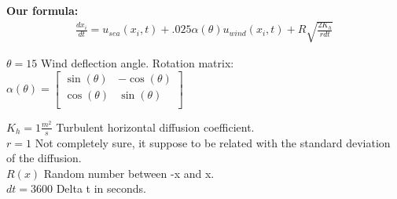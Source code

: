 \documentclass[a4paper,12pt]{article}
\begin{document}
\textbf{Our formula:}
\begin{equation}
\begin{split}
\frac{dx_i}{dt} = u_{sea}(x_i, t) + .025 \alpha(\theta) u_{wind}(x_i,t) + R \sqrt{\frac{2K_h}{r dt}} 
\end{split}
\end{equation}

$\theta = 15$ Wind deflection angle. Rotation matrix:  
$
\alpha(\theta)
 = 
    \begin{bmatrix}
        \sin(\theta) & -\cos(\theta) \\
        \cos(\theta) & \sin(\theta) \\
    \end{bmatrix}
$

$K_h  = 1 \frac{m^2}{s}$ Turbulent horizontal diffusion coefficient. \\
$r  = 1$ Not completely sure, it suppose to be related with the standard deviation of the diffusion. \\
$R(x)$ Random number between -x and x. \\
$dt = 3600$ Delta t in seconds.\\
\end{document}

